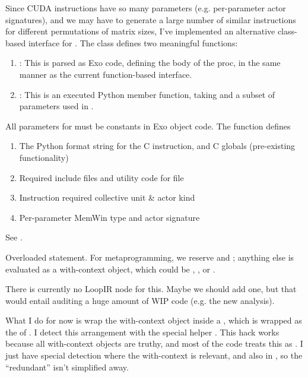 \filbreak
{} Since CUDA instructions have so many parameters (e.g. per-parameter actor signatures), and we may have to generate a large number of similar instructions for different permutations of matrix sizes, I've implemented an alternative class-based interface for .
The class defines two meaningful functions:
\begin{enumerate}
  \item {}: This is parsed as Exo code, defining the body of the  proc, in the same manner as the current function-based  interface.
  \filbreak
  \item {}: This is an executed Python member function, taking  and a subset of parameters used in .
\end{enumerate}

\filbreak
All parameters for  must be constants in Exo object code.
The  function defines
\begin{enumerate}
  \item The Python format string for the C instruction, and C globals (pre-existing  functionality)
  \filbreak
  \item Required include files and utility code for  file
  \filbreak
  \item Instruction required collective unit \& actor kind
  \filbreak
  \item Per-parameter MemWin type and actor signature
\end{enumerate}

\filbreak
See .

\filbreak
{} Overloaded  statement.
For metaprogramming, we reserve  and ;
anything else is evaluated as a with-context object, which could be , , or .

\filbreak
There is currently no LoopIR node for this.
Maybe we should add one, but that would entail auditing a huge amount of WIP code (e.g. the new analysis).

\filbreak
What I do for now is wrap the with-context object inside a , which is wrapped as the  of .
I detect this arrangement with the special helper .
This hack works because all with-context objects are truthy, and most of the code treats this as .
I just have special detection where the with-context is relevant, and also in , so the ``redundant''  isn't simplified away.

\filbreak
{}


